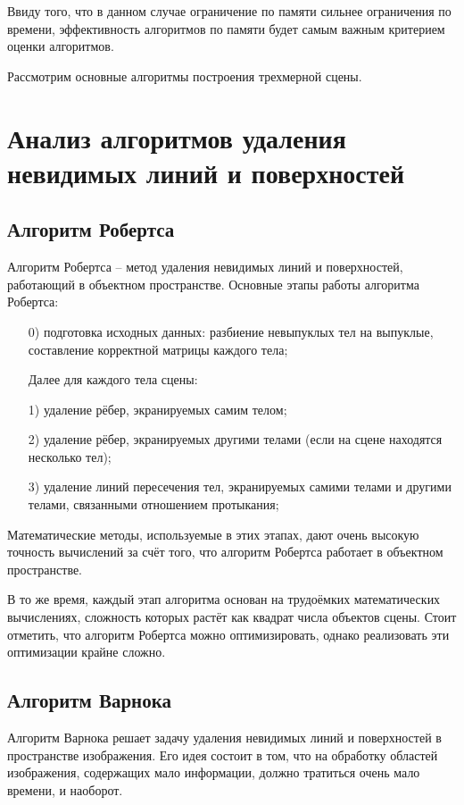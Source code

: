 Ввиду того, что в данном случае ограничение по памяти сильнее ограничения по времени, эффективность алгоритмов по памяти будет самым важным критерием оценки алгоритмов.

Рассмотрим основные алгоритмы построения трехмерной сцены. \cite{Rogers}

\section{Анализ алгоритмов удаления невидимых линий и поверхностей}
\subsection{Алгоритм Робертса}
Алгоритм Робертса – метод удаления невидимых линий и поверхностей, работающий в объектном пространстве. Основные этапы работы алгоритма Робертса:
\begin{enumerate}
	\item[0)] подготовка исходных данных: разбиение невыпуклых тел на выпуклые, составление корректной матрицы каждого тела;
	\item[] Далее для каждого тела сцены:
	\item[1)] удаление рёбер, экранируемых самим телом;
	\item[2)] удаление рёбер, экранируемых другими телами (если на сцене находятся несколько тел);
	\item[3)] удаление линий пересечения тел, экранируемых самими телами и другими телами, связанными отношением протыкания;
\end{enumerate}

Математические методы, используемые в этих этапах, дают очень высокую точность вычислений за счёт того, что алгоритм Робертса работает в объектном пространстве. 

В то же время, каждый этап алгоритма основан на трудоёмких математических вычислениях, сложность которых растёт как квадрат числа объектов сцены. Стоит отметить, что алгоритм Робертса можно оптимизировать, однако реализовать эти оптимизации крайне сложно.

\subsection{Алгоритм Варнока}
Алгоритм Варнока решает задачу удаления невидимых линий и поверхностей в пространстве изображения. Его идея состоит в том, что на обработку областей изображения, содержащих мало информации, должно тратиться очень мало времени, и наоборот. 


